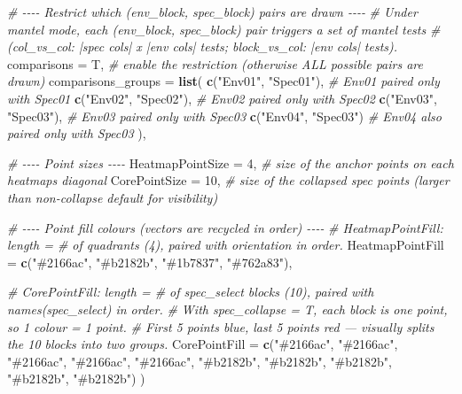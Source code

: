 \documentclass[
]{book}
\newenvironment{Shaded}{\begin{snugshade}}{\end{snugshade}}
\newcommand{\AttributeTok}[1]{\textcolor[rgb]{0.13,0.29,0.53}{#1}}
\newcommand{\CommentTok}[1]{\textcolor[rgb]{0.56,0.35,0.01}{\textit{#1}}}
\newcommand{\DecValTok}[1]{\textcolor[rgb]{0.00,0.00,0.81}{#1}}
\newcommand{\FunctionTok}[1]{\textcolor[rgb]{0.13,0.29,0.53}{\textbf{#1}}}
\newcommand{\NormalTok}[1]{#1}
\newcommand{\StringTok}[1]{\textcolor[rgb]{0.31,0.60,0.02}{#1}}
\begin{document}
\begin{Shaded}
\begin{Highlighting}[]
  \CommentTok{\# {-}{-}{-}{-} Restrict which (env\_block, spec\_block) pairs are drawn {-}{-}{-}{-}}
  \CommentTok{\# Under mantel mode, each (env\_block, spec\_block) pair triggers a set of mantel tests}
  \CommentTok{\# (col\_vs\_col: |spec cols| x |env cols| tests; block\_vs\_col: |env cols| tests).}
  \AttributeTok{comparisons =}\NormalTok{ T,                           }\CommentTok{\# enable the restriction (otherwise ALL possible pairs are drawn)}
  \AttributeTok{comparisons\_groups =} \FunctionTok{list}\NormalTok{(}
    \FunctionTok{c}\NormalTok{(}\StringTok{"Env01"}\NormalTok{, }\StringTok{"Spec01"}\NormalTok{),                    }\CommentTok{\# Env01 paired only with Spec01}
    \FunctionTok{c}\NormalTok{(}\StringTok{"Env02"}\NormalTok{, }\StringTok{"Spec02"}\NormalTok{),                    }\CommentTok{\# Env02 paired only with Spec02}
    \FunctionTok{c}\NormalTok{(}\StringTok{"Env03"}\NormalTok{, }\StringTok{"Spec03"}\NormalTok{),                    }\CommentTok{\# Env03 paired only with Spec03}
    \FunctionTok{c}\NormalTok{(}\StringTok{"Env04"}\NormalTok{, }\StringTok{"Spec03"}\NormalTok{)                     }\CommentTok{\# Env04 also paired only with Spec03}
\NormalTok{  ),}

  \CommentTok{\# {-}{-}{-}{-} Point sizes {-}{-}{-}{-}}
  \AttributeTok{HeatmapPointSize =} \DecValTok{4}\NormalTok{,                      }\CommentTok{\# size of the anchor points on each heatmap\textquotesingle{}s diagonal}
  \AttributeTok{CorePointSize    =} \DecValTok{10}\NormalTok{,                     }\CommentTok{\# size of the collapsed spec points (larger than non{-}collapse default for visibility)}

  \CommentTok{\# {-}{-}{-}{-} Point fill colours (vectors are recycled in order) {-}{-}{-}{-}}
  \CommentTok{\# HeatmapPointFill: length = \# of quadrants (4), paired with \textasciigrave{}orientation\textasciigrave{} in order.}
  \AttributeTok{HeatmapPointFill =} \FunctionTok{c}\NormalTok{(}\StringTok{"\#2166ac"}\NormalTok{, }\StringTok{"\#b2182b"}\NormalTok{, }\StringTok{"\#1b7837"}\NormalTok{, }\StringTok{"\#762a83"}\NormalTok{),}

  \CommentTok{\# CorePointFill: length = \# of spec\_select blocks (10), paired with names(spec\_select) in order.}
  \CommentTok{\# With spec\_collapse = T, each block is one point, so 1 colour = 1 point.}
  \CommentTok{\# First 5 points blue, last 5 points red — visually splits the 10 blocks into two groups.}
  \AttributeTok{CorePointFill =} \FunctionTok{c}\NormalTok{(}\StringTok{"\#2166ac"}\NormalTok{, }\StringTok{"\#2166ac"}\NormalTok{, }\StringTok{"\#2166ac"}\NormalTok{, }\StringTok{"\#2166ac"}\NormalTok{,}
                    \StringTok{"\#2166ac"}\NormalTok{, }\StringTok{"\#b2182b"}\NormalTok{, }\StringTok{"\#b2182b"}\NormalTok{, }\StringTok{"\#b2182b"}\NormalTok{,}
                    \StringTok{"\#b2182b"}\NormalTok{, }\StringTok{"\#b2182b"}\NormalTok{)}
\NormalTok{)}
\end{Highlighting}
\end{Shaded}
\end{document}
